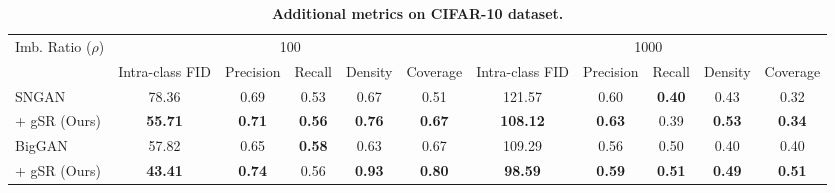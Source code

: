 \documentclass[runningheads,table]{llncs}
\begin{document}
\begin{table}[!b]{

\vspace{-0.4cm}
\caption{\textbf{Additional metrics on CIFAR-10 dataset.}}
\label{tab:supp:intra-fid}}
\resizebox{\linewidth}{!}
{ 
\begin{tabular}{lccccc|ccccc}
\toprule
Imb. Ratio ($\rho$)                & \multicolumn{5}{c|}{100}                                                                          & \multicolumn{5}{c}{1000}                                                                          \\
                                  & \multicolumn{1}{l}{Intra-class FID} & Precision & Recall & \multicolumn{1}{l}{Density} & Coverage & \multicolumn{1}{l}{Intra-class FID} & Precision & Recall & Density & \multicolumn{1}{l}{Coverage} \\ \cmidrule(l){2-11} 
SNGAN   & 78.36                               & 0.69      & 0.53   & 0.67                        & 0.51     & {121.57}          & 0.60      & \textbf{0.40}    & 0.43    & 0.32                         \\
 \; + gSR (Ours) & \textbf{55.71}                               & \textbf{0.71}      & \textbf{0.56}   & \textbf{0.76}                        & \textbf{0.67}     & \textbf{108.12}                              & \textbf{0.63}      & 0.39   & \textbf{0.53}    & \textbf{0.34}                         \\ \midrule
BigGAN       & 57.82                               & 0.65      & \textbf{0.58}   & 0.63                        & 0.67     & 109.29                              & 0.56     & 0.50   & 0.40    & 0.40                          \\
 \; + gSR (Ours) & \textbf{43.41}                               & \textbf{0.74}      & 0.56   & \textbf{0.93}                        & \textbf{0.80}      & \textbf{98.59}                               & \textbf{0.59}      & \textbf{0.51}   & \textbf{0.49}    & \textbf{0.51}                         \\ \bottomrule
\end{tabular}
}

\vspace{-0.5cm}
\end{table}
\end{document}
